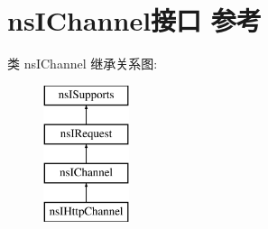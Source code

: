\hypertarget{interfacens_i_channel}{}\section{ns\+I\+Channel接口 参考}
\label{interfacens_i_channel}
类 ns\+I\+Channel 继承关系图\+:\begin{figure}[H]
\begin{center}
\leavevmode
\includegraphics[height=4.000000cm]{interfacens_i_channel}
\end{center}
\end{figure}
